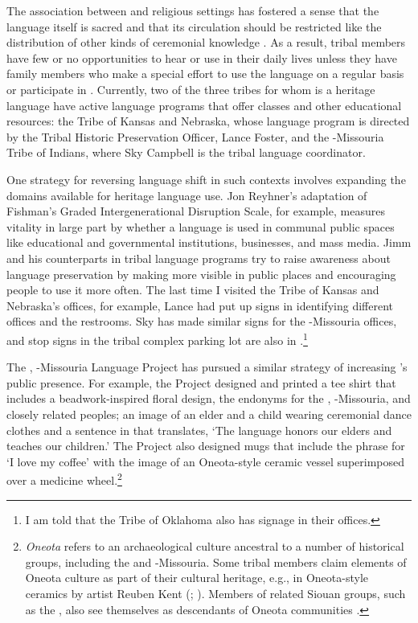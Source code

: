 \documentclass[output=paper]{LSP/langsci}
\begin{document}
The association between  and religious settings has fostered a sense that the language itself is sacred and that its circulation should be restricted like the distribution of other kinds of ceremonial knowledge \citep{Davidson1997}. As a result, tribal members have few or no opportunities to hear or use  in their daily lives unless they have family members who make a special effort to use the language on a regular basis or participate in . Currently, two of the three tribes for whom  is a heritage language have active language programs that offer classes and other educational resources: the  Tribe of Kansas and Nebraska, whose language program is directed by the Tribal Historic Preservation Officer, Lance Foster, and the -Missouria Tribe of Indians, where Sky Campbell is the tribal language coordinator.

One strategy for reversing language shift in such contexts involves expanding the domains available for heritage language use. Jon Reyhner's \citeyearpar[vii]{Reyhner1999} adaptation of Fishman's \citeyearpar{Fishman1991} Graded Intergenerational Disruption Scale, for example, measures vitality in large part by whether a language is used in communal public spaces like educational and governmental institutions, businesses, and mass media. Jimm and his counterparts in tribal language programs try to raise awareness about language preservation by making  more visible in public places and encouraging people to use it more often. The last time I visited the  Tribe of Kansas and Nebraska's offices, for example, Lance had put up signs in  identifying different offices and the restrooms. Sky has made similar signs for the -Missouria offices, and stop signs in the tribal complex parking lot are also in .\footnote{I am told that the  Tribe of Oklahoma also has  signage in their offices.}

The , -Missouria Language Project has pursued a similar strategy of increasing 's public presence. For example, the Project designed and printed a tee shirt that includes a beadwork-inspired floral design, the  endonyms for the , -Missouria, and closely related  peoples; an image of an elder and a child wearing ceremonial dance clothes and a sentence in  that translates, `The language honors our elders and teaches our children.' The Project also designed mugs that include the  phrase for `I love my coffee' with the image of an Oneota-style ceramic vessel superimposed over a medicine wheel.\footnote{\emph{Oneota} refers to an archaeological culture ancestral to a number of historical groups, including the  and -Missouria. Some tribal members claim elements of Oneota culture as part of their cultural heritage, e.g., in Oneota-style ceramics by  artist Reuben Kent (\citeyear{KentND}; \citealt{RundleRundle2007}). Members of related Siouan groups, such as the , also see themselves as descendants of Oneota communities \citep{Buffalohead2004}.}
\end{document}
